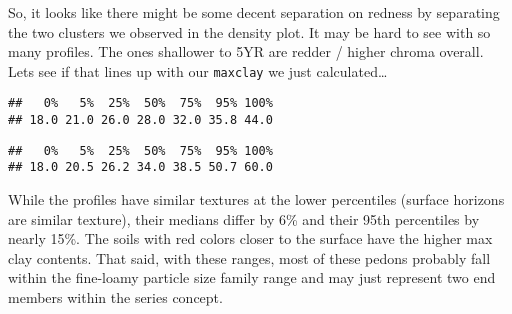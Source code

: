 \documentclass[]{article}
\newenvironment{Shaded}{\begin{snugshade}}{\end{snugshade}}
\newcommand{\KeywordTok}[1]{\textcolor[rgb]{0.13,0.29,0.53}{\textbf{#1}}}
\newcommand{\DataTypeTok}[1]{\textcolor[rgb]{0.13,0.29,0.53}{#1}}
\newcommand{\DecValTok}[1]{\textcolor[rgb]{0.00,0.00,0.81}{#1}}
\newcommand{\FloatTok}[1]{\textcolor[rgb]{0.00,0.00,0.81}{#1}}
\newcommand{\OperatorTok}[1]{\textcolor[rgb]{0.81,0.36,0.00}{\textbf{#1}}}
\newcommand{\NormalTok}[1]{#1}
\begin{document}
So, it looks like there might be some decent separation on redness by
separating the two clusters we observed in the density plot. It may be
hard to see with so many profiles. The ones shallower to 5YR are redder
/ higher chroma overall. Lets see if that lines up with our
\texttt{maxclay} we just calculated\ldots{}

\begin{Shaded}
\end{Shaded}

\begin{verbatim}
##   0%   5%  25%  50%  75%  95% 100% 
## 18.0 21.0 26.0 28.0 32.0 35.8 44.0
\end{verbatim}

\begin{Shaded}
\end{Shaded}

\begin{verbatim}
##   0%   5%  25%  50%  75%  95% 100% 
## 18.0 20.5 26.2 34.0 38.5 50.7 60.0
\end{verbatim}

While the profiles have similar textures at the lower percentiles
(surface horizons are similar texture), their medians differ by 6\% and
their 95th percentiles by nearly 15\%. The soils with red colors closer
to the surface have the higher max clay contents. That said, with these
ranges, most of these pedons probably fall within the fine-loamy
particle size family range and may just represent two end members within
the series concept.
\end{document}

